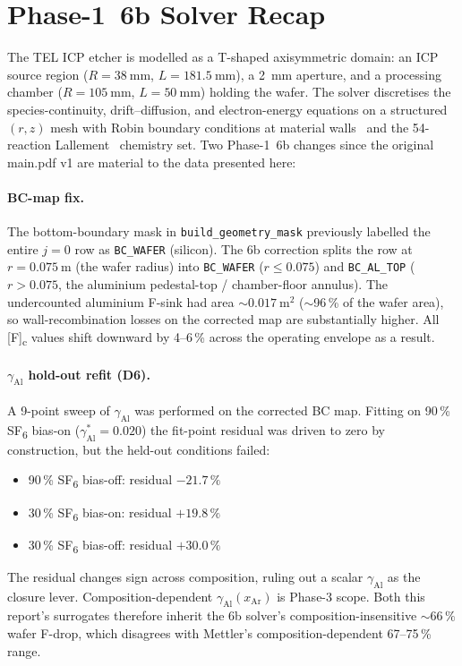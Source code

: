 \documentclass[11pt,a4paper]{article}
\begin{document}
\section{Phase-1~6b Solver Recap}
\label{sec:recap}

The TEL ICP etcher is modelled as a T-shaped axisymmetric domain: an
ICP source region ($R = \SI{38}{\milli\metre}$,
$L = \SI{181.5}{\milli\metre}$), a \SI{2}{\milli\metre} aperture, and
a processing chamber ($R = \SI{105}{\milli\metre}$,
$L = \SI{50}{\milli\metre}$) holding the wafer.  The solver
discretises the species-continuity, drift--diffusion, and
electron-energy equations on a structured $(r,z)$ mesh with Robin
boundary conditions at material walls~\citep{kokkoris2008} and the
54-reaction Lallement~\citep{lallement2009} chemistry set.  Two
Phase-1~6b changes since the original main.pdf v1 are material to the
data presented here:

\paragraph{BC-map fix.}
The bottom-boundary mask in \texttt{build\_geometry\_mask} previously
labelled the entire $j=0$ row as \texttt{BC\_WAFER} (silicon).  The
6b correction splits the row at $r = \SI{0.075}{\metre}$ (the wafer
radius) into \texttt{BC\_WAFER} ($r \le 0.075$) and
\texttt{BC\_AL\_TOP} ($r > 0.075$, the aluminium pedestal-top /
chamber-floor annulus).  The undercounted aluminium F-sink had
area $\sim\SI{0.017}{\metre\squared}$ ($\sim$96\,\% of the wafer
area), so wall-recombination losses on the corrected map are
substantially higher.  All [F]\textsubscript{c} values shift downward
by 4--6\,\% across the operating envelope as a result.

\paragraph{$\gamma_\mathrm{Al}$ hold-out refit (D6).}
A 9-point sweep of $\gamma_\mathrm{Al}$ was performed on the corrected
BC map.  Fitting on 90\,\% SF\textsubscript{6} bias-on
($\gamma_\mathrm{Al}^* = 0.020$) the fit-point residual was driven to
zero by construction, but the held-out conditions failed:
\begin{itemize}[itemsep=1pt,topsep=2pt]
  \item 90\,\% SF\textsubscript{6} bias-off: residual $-21.7\,\%$
  \item 30\,\% SF\textsubscript{6} bias-on: residual $+19.8\,\%$
  \item 30\,\% SF\textsubscript{6} bias-off: residual $+30.0\,\%$
\end{itemize}
The residual changes sign across composition, ruling out a scalar
$\gamma_\mathrm{Al}$ as the closure lever.  Composition-dependent
$\gamma_\mathrm{Al}(x_\mathrm{Ar})$ is Phase-3 scope.  Both this
report's surrogates therefore inherit the 6b solver's
composition-insensitive ${\sim}66\,\%$ wafer F-drop, which
disagrees with Mettler's composition-dependent 67--75\,\% range.
\end{document}
